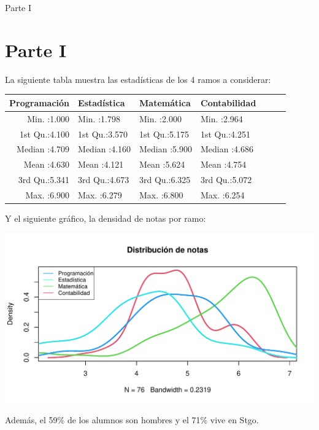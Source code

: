 \documentclass[pdf]{beamer}
\begin{document}
\begin{frame}{Parte I}
\section{Parte I}
\begin{footnotesize} 
La siguiente tabla muestra las estadísticas de los 4 ramos a considerar:

\begin{table}[ht]
\centering
\begin{tabular}{rllllll}
  \hline
  Programación & Estadística & Matemática & Contabilidad \\ 
  \hline
  Min.   :1.000   & Min.   :1.798   & Min.   :2.000   & Min.   :2.964  \\ 
  1st Qu.:4.100   & 1st Qu.:3.570   & 1st Qu.:5.175   & 1st Qu.:4.251  \\ 
  Median :4.709   & Median :4.160   & Median :5.900   & Median :4.686  \\ 
  Mean   :4.630   & Mean   :4.121   & Mean   :5.624   & Mean   :4.754  \\ 
  3rd Qu.:5.341   & 3rd Qu.:4.673   & 3rd Qu.:6.325   & 3rd Qu.:5.072  \\ 
  Max.   :6.900   & Max.   :6.279   & Max.   :6.800   & Max.   :6.254  \\ 
   \hline
\end{tabular}
\end{table}

Y el siguiente gráfico, la densidad de notas por ramo:
\begin{center}
\includegraphics[trim={1cm 1cm 1cm 1cm},width=0.6\linewidth]{rplot01.pdf}
\end{center}
Además, el 59\% de los alumnos son hombres y el 71\% vive en Stgo.

\end{footnotesize}

\end{frame}
\end{document}
